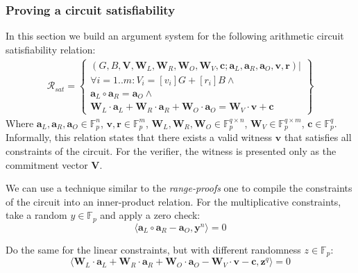 \documentclass[../../book.tex]{subfiles}
\begin{document}
\subsubsection{Proving a circuit satisfiability}
In this section we build an argument system for the following arithmetic circuit satisfiability relation:
\begin{equation}
    \begin{aligned}
        \mathcal{R}_{sat} = \left\{
            \begin{array}{l} 
                (G, B, \mathbf{V}, \mathbf{W}_L, \mathbf{W}_R, \mathbf{W}_O, \mathbf{W}_V, \mathbf{c}; \mathbf{a}_L, \mathbf{a}_R, \mathbf{a}_O, \mathbf{v}, \mathbf{r}) | \\ 
                \forall i=1..m: V_i = [v_i]G + [r_i]B \wedge \\
                \mathbf{a}_L \circ \mathbf{a}_R = \mathbf{a}_O \wedge \\
                \mathbf{W}_L \cdot \mathbf{a}_L + \mathbf{W}_R \cdot \mathbf{a}_R + \mathbf{W}_O \cdot \mathbf{a}_O = \mathbf{W}_V \cdot \mathbf{v} + \mathbf{c}
        \end{array}\right\}
    \end{aligned}
\end{equation}
Where $\mathbf{a}_L, \mathbf{a}_R, \mathbf{a}_O \in \mathbb{F}_p^n$, $\mathbf{v}, \mathbf{r} \in \mathbb{F}_p^m$, $\mathbf{W}_L, \mathbf{W}_R, \mathbf{W}_O \in \mathbb{F}_p^{q \times n}$, $\mathbf{W}_V \in \mathbb{F}_p^{q \times m}$, $\mathbf{c} \in \mathbb{F}_p^q$.
Informally, this relation states that there exists a valid witness $\mathbf{v}$ that satisfies all constraints of the circuit. For the verifier, the witness is presented only as the commitment vector $\mathbf{V}$.

We can use a technique similar to the \textit{range-proofs} one to compile the constraints of the circuit into an inner-product relation. For the multiplicative constraints, take a random $y \in \mathbb{F}_p$ and apply a zero check:
$$ \langle \mathbf{a}_L \circ \mathbf{a}_R - \mathbf{a}_O, \mathbf{y}^n \rangle = 0$$

Do the same for the linear constraints, but with different randomness $z \in \mathbb{F}_p$:
$$ \langle \mathbf{W}_L \cdot \mathbf{a}_L + \mathbf{W}_R \cdot \mathbf{a}_R + \mathbf{W}_O \cdot \mathbf{a}_O - \mathbf{W}_V \cdot \mathbf{v} - \mathbf{c}, \mathbf{z}^q \rangle = 0$$
\end{document}
